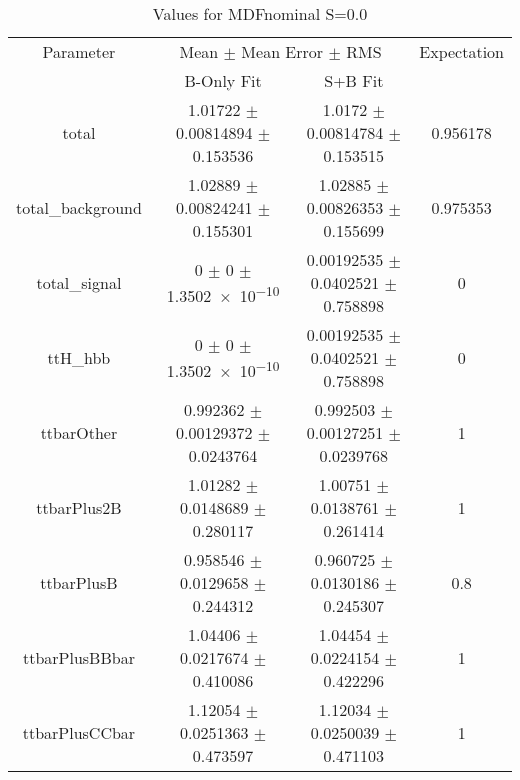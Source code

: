 \begin{table}
\centering
\caption{Values for MDFnominal S=0.0}
\begin{tabular}{cccc}
\toprule
Parameter & \multicolumn{2}{c}{Mean $\pm$ Mean Error $\pm$ RMS} & Expectation\\
 & B-Only Fit & S+B Fit & \\
\midrule
total & \num{1.01722} $\pm$ \num{0.00814894} $\pm$ \num{0.153536} & \num{1.0172} $\pm$ \num{0.00814784} $\pm$ \num{0.153515} & \num{0.956178}\\
total\_background & \num{1.02889} $\pm$ \num{0.00824241} $\pm$ \num{0.155301} & \num{1.02885} $\pm$ \num{0.00826353} $\pm$ \num{0.155699} & \num{0.975353}\\
total\_signal & \num{0} $\pm$ \num{0} $\pm$ \num{1.3502e-10} & \num{0.00192535} $\pm$ \num{0.0402521} $\pm$ \num{0.758898} & \num{0}\\
ttH\_hbb & \num{0} $\pm$ \num{0} $\pm$ \num{1.3502e-10} & \num{0.00192535} $\pm$ \num{0.0402521} $\pm$ \num{0.758898} & \num{0}\\
ttbarOther & \num{0.992362} $\pm$ \num{0.00129372} $\pm$ \num{0.0243764} & \num{0.992503} $\pm$ \num{0.00127251} $\pm$ \num{0.0239768} & \num{1}\\
ttbarPlus2B & \num{1.01282} $\pm$ \num{0.0148689} $\pm$ \num{0.280117} & \num{1.00751} $\pm$ \num{0.0138761} $\pm$ \num{0.261414} & \num{1}\\
ttbarPlusB & \num{0.958546} $\pm$ \num{0.0129658} $\pm$ \num{0.244312} & \num{0.960725} $\pm$ \num{0.0130186} $\pm$ \num{0.245307} & \num{0.8}\\
ttbarPlusBBbar & \num{1.04406} $\pm$ \num{0.0217674} $\pm$ \num{0.410086} & \num{1.04454} $\pm$ \num{0.0224154} $\pm$ \num{0.422296} & \num{1}\\
ttbarPlusCCbar & \num{1.12054} $\pm$ \num{0.0251363} $\pm$ \num{0.473597} & \num{1.12034} $\pm$ \num{0.0250039} $\pm$ \num{0.471103} & \num{1}\\
\bottomrule
\end{tabular}
\end{table}